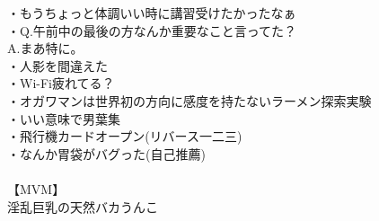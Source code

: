 \documentclass[12pt]{jsarticle}
\begin{document}
・もうちょっと体調いい時に講習受けたかったなぁ\\
・Q.午前中の最後の方なんか重要なこと言ってた？\\
    A.まあ特に。\\
・人影を間違えた\\
・Wi-Fi疲れてる？\\
・オガワマンは世界初の方向に感度を持たないラーメン探索実験\\
・いい意味で男葉集\\
・飛行機カードオープン(リバース一二三)\\
・なんか胃袋がバグった(自己推薦)\\
 \\
【MVM】\\
淫乱巨乳の天然バカうんこ\\

\newpage
\end{document}

